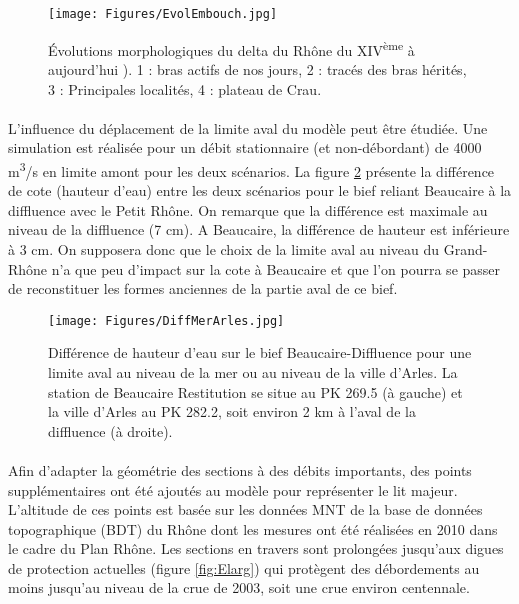 \documentclass[11pt]{article}
\begin{document}
	\begin{figure}[h]
		\centering
	    \texttt{[image: Figures/EvolEmbouch.jpg]}
        \caption{Évolutions morphologiques du delta du Rhône du XIV\textsuperscript{ème} à aujourd'hui \citep{pichard_les_2014}). 1 : bras actifs de nos jours, 2 : tracés des bras hérités, 3 : Principales localités, 4 : plateau de Crau.}
		\label{fig:Embouch}
	\end{figure}

	\paragraph{} L'influence du déplacement de la limite aval du modèle peut être étudiée. Une simulation est réalisée pour un débit stationnaire (et non-débordant) de 4000 m\textsuperscript{3}/s en limite amont pour les deux scénarios. La figure \ref{fig:DifMerArles} présente la différence de cote (hauteur d'eau) entre les deux scénarios pour le bief reliant Beaucaire à la diffluence avec le Petit Rhône. On remarque que la différence est maximale au niveau de la diffluence (7 cm). A Beaucaire, la différence de hauteur est inférieure à 3 cm. On supposera donc que le choix de la limite aval au niveau du Grand-Rhône n'a que peu d'impact sur la cote à Beaucaire et que l'on pourra se passer de reconstituer les formes anciennes de la partie aval de ce bief. 
	 
	\begin{figure}[h]
	\centering
		\texttt{[image: Figures/DiffMerArles.jpg]}
        \caption{Différence de hauteur d'eau sur le bief Beaucaire-Diffluence pour une limite aval au niveau de la mer ou au niveau de la ville d'Arles. La station de Beaucaire Restitution se situe au PK 269.5 (à gauche) et la ville d'Arles au PK 282.2, soit environ 2 km à l'aval de la diffluence (à droite).}
		\label{fig:DifMerArles}
	\end{figure}			 
	 	
\FloatBarrier

	\paragraph{} Afin d'adapter la géométrie des sections à des débits importants, des points supplémentaires ont été ajoutés au modèle pour représenter le lit majeur. L'altitude de ces points est basée sur les données MNT de la base de données topographique (BDT) du Rhône dont les mesures ont été réalisées en 2010 dans le cadre du Plan Rhône. Les sections en travers sont prolongées jusqu'aux digues de protection actuelles (figure \ref{fig:Elarg}) qui protègent des débordements au moins jusqu'au niveau de la crue de 2003, soit une crue environ centennale. 
	
\end{document}
